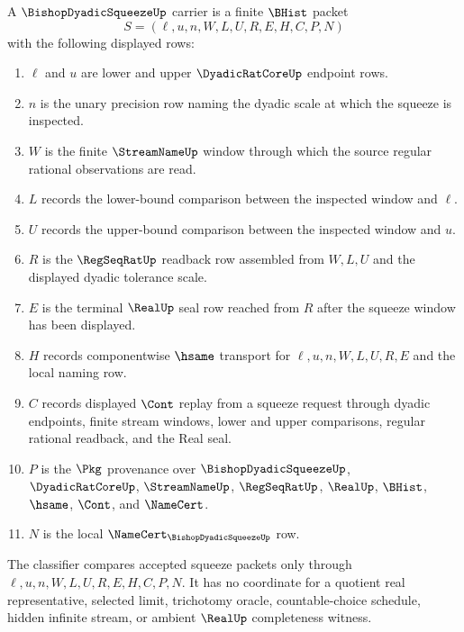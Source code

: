 \begin{definition}
\label{def:bishop-dyadic-squeeze-carrier}
A $\BishopDyadicSqueezeUp$ carrier is a finite $\BHist$ packet
$$
S=(\ell,u,n,W,L,U,R,E,H,C,P,N)
$$
with the following displayed rows:
\begin{enumerate}
\item $\ell$ and $u$ are lower and upper $\DyadicRatCoreUp$ endpoint rows.
\item $n$ is the unary precision row naming the dyadic scale at which the squeeze is inspected.
\item $W$ is the finite $\StreamNameUp$ window through which the source regular rational observations are read.
\item $L$ records the lower-bound comparison between the inspected window and $\ell$.
\item $U$ records the upper-bound comparison between the inspected window and $u$.
\item $R$ is the $\RegSeqRatUp$ readback row assembled from $W,L,U$ and the displayed dyadic tolerance scale.
\item $E$ is the terminal $\RealUp$ seal row reached from $R$ after the squeeze window has been displayed.
\item $H$ records componentwise $\hsame$ transport for $\ell,u,n,W,L,U,R,E$ and the local naming row.
\item $C$ records displayed $\Cont$ replay from a squeeze request through dyadic endpoints, finite stream windows, lower and upper comparisons, regular rational readback, and the Real seal.
\item $P$ is the $\Pkg$ provenance over $\BishopDyadicSqueezeUp$, $\DyadicRatCoreUp$, $\StreamNameUp$, $\RegSeqRatUp$, $\RealUp$, $\BHist$, $\hsame$, $\Cont$, and $\NameCert$.
\item $N$ is the local $\NameCert_{\BishopDyadicSqueezeUp}$ row.
\end{enumerate}
The classifier compares accepted squeeze packets only through $\ell,u,n,W,L,U,R,E,H,C,P,N$. It has no coordinate for a quotient real representative, selected limit, trichotomy oracle, countable-choice schedule, hidden infinite stream, or ambient $\RealUp$ completeness witness.
\end{definition}

